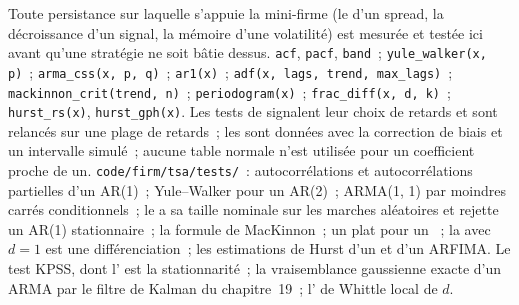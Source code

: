 \begin{build}
 Toute persistance sur laquelle s'appuie la mini-firme (le  d'un spread, la décroissance d'un signal, la mémoire d'une volatilité) est mesurée et testée
ici avant qu'une stratégie ne soit bâtie dessus.
 \texttt{acf}, \texttt{pacf}, \texttt{band}~; \texttt{yule\_walker(x, p)}~; \texttt{arma\_css(x, p, q)}~; \texttt{ar1(x)}~; \texttt{adf(x, lags,
trend, max\_lags)}~; \texttt{mackinnon\_crit(trend, n)}~; \texttt{periodogram(x)}~; \texttt{frac\_diff(x, d, k)}~; \texttt{hurst\_rs(x)}, \texttt{hurst\_gph(x)}.
 Les tests de  signalent leur choix de retards et sont relancés sur une plage de retards~; les  sont données avec la correction de biais et un
intervalle simulé~; aucune table normale n'est utilisée pour un coefficient proche de un.
 \texttt{code/firm/tsa/tests/}~: autocorrélations et autocorrélations partielles d'un AR(1)~; Yule--Walker pour un AR(2)~; ARMA(1, 1) par
moindres carrés conditionnels~; le  a sa taille nominale sur les marches aléatoires et rejette un AR(1) stationnaire~; la formule de MacKinnon~; un  plat pour
un ~; la  avec $d = 1$ est une différenciation~; les estimations de Hurst d'un  et d'un ARFIMA.
 Le test KPSS, dont l' est la stationnarité~; la vraisemblance gaussienne exacte d'un ARMA par le filtre de Kalman du chapitre~19~; l' de Whittle local de $d$.
\end{build}

